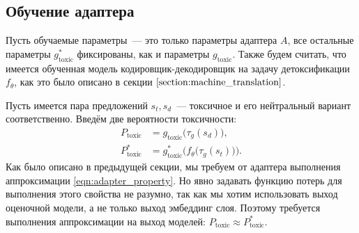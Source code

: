 \subsection{Обучение адаптера} 
\label{section:adapter_training}
Пусть обучаемые параметры~--- это только параметры адаптера $A$, все остальные параметры $g_{\text{toxic}}^{*}$ фиксированы, как и параметры $g_{\text{toxic}}$.
Также будем считать, что имеется обученная модель кодировщик-декодировщик на задачу детоксификации $f_{\theta}$, как это было описано в секции $\ref{section:machine_translation}$. 

Пусть имеется пара предложений $s_t, s_d$~--- токсичное и его нейтральный вариант соответственно. 
Введём две вероятности токсичности: 
\begin{align*}
    P_{\text{toxic}} &= g_{\text{toxic}} \bigl(\tau_{g}(s_d) \bigr), \\
    P^{*}_{\text{toxic}} &= g^{*}_{\text{toxic}} \bigl(f_{\theta} \bigl(\tau_{g}(s_t)\bigr) \bigr). 
\end{align*} 
Как было описано в предыдущей секции, мы требуем от адаптера выполнения аппроксимации \eqref{eqn:adapter_property}. 
Но явно задавать функцию потерь для выполнения этого свойства не разумно, так как мы хотим использовать выход оценочной модели, а не только выход эмбеддинг слоя.
Поэтому требуется выполнения аппроксимации на выход моделей: $P_{\text{toxic}} \approx P^{*}_{\text{toxic}}$. 

